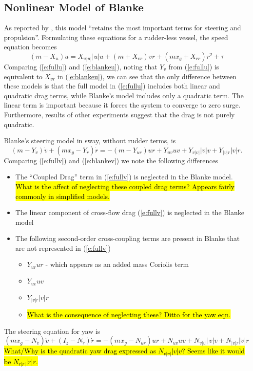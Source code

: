 \documentclass[11pt,draftcls,journal,onecolumn]{IEEEtran}
\begin{document}
\subsection{Nonlinear Model of Blanke}
As reported by \cite{fossen94guidance}, this model ``retains the most important terms for steering and propulsion''.  Formulating these equations for a rudder-less vessel, the speed equation becomes
\begin{equation}
(m-X_{\dot{u}}) \dot{u} = X_{u|u|}|u|u + (m+X_{vr})vr + (mx_g+X_{rr})r^2 + \tau
\label{e:blankeu}
\end{equation}
Comparing (\ref{e:fullu}) and (\ref{e:blankeu}), noting that $Y_{\dot{v}}$ from  (\ref{e:fullu}) is equivalent to $X_{vr}$ in (\ref{e:blankeu}),  we can see that the only difference between these models is that the full model in (\ref{e:fullu}) includes both linear and quadratic drag terms, while Blanke's model includes only a quadratic term.  The linear term is important because it forces the system to converge to zero surge.  Furthermore, results of other experiments suggest that the drag is not purely quadratic.  

Blanke's steering model in sway, without rudder terms, is
\begin{equation}
(m-Y_{\dot{v}}) \dot{v} + (m x_g - Y_{\dot{r}}) \dot{r}
=
-(m -Y_{ur})ur + Y_{uv}uv + Y_{v|v|}|v|v + Y_{|v|r}|v|r.
\label{e:blankev}
\end{equation}
Comparing (\ref{e:fullv}) and (\ref{e:blankev}) we note the following differences
\begin{itemize}
\item The ``Coupled Drag'' term in (\ref{e:fullv}) is neglected in the Blanke model. \hl{What is the affect of neglecting these coupled drag terms? Appears fairly commonly in simplified models.}
\item The linear component of cross-flow drag (\ref{e:fullv}) is neglected in the Blanke model
\item The following second-order cross-coupling terms are present in Blanke that are not represented in  (\ref{e:fullv})
  \begin{itemize}
    \item $Y_{ur}ur$ - which appears as an added mass Coriolis term
    \item $Y_{uv}uv$
    \item $Y_{|v|r}|v|r$
    \item \hl{What is the consequence of neglecting these? 
Ditto for the yaw eqn.}
  \end{itemize}
\end{itemize}
The steering equation for yaw is
\begin{equation}
(m x_g - N_{\dot{v}})\dot{v} + (I_z - N_{\dot{r}})\dot{r}
=
-(m x_g - N_{ur})ur + N_{uv}uv + N_{v|v|}|v|v + N_{|v|r}|v|r
\label{e:blanker}
\end{equation}
\hl{What/Why is the quadratic yaw drag expressed as $N_{v|v|}|v|v$?  Seems like it would be $N_{r|r|}|r|r$.}
\end{document}
